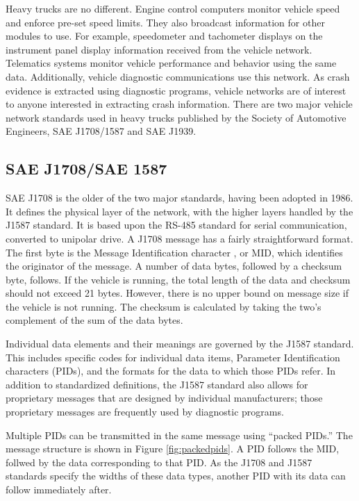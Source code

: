 Heavy trucks are no different. Engine control computers monitor vehicle speed and enforce pre-set speed limits. They also broadcast information
for other modules to use. For example, speedometer and tachometer displays on the instrument panel display information received from the vehicle
network. Telematics systems monitor vehicle performance and behavior using the same data. Additionally, vehicle diagnostic communications use
this network. As crash evidence is extracted using diagnostic programs, vehicle networks are of interest to anyone interested in extracting
crash information. There are two major vehicle network standards used in heavy trucks published by the Society of Automotive Engineers,
 SAE J1708/1587\cite{J1708}\cite{J1587} and SAE J1939\cite{J1939-71}.

\subsection{SAE J1708/SAE 1587}

SAE J1708 is the older of the two major standards, having been adopted in 1986. It defines the physical layer of the network,
with the higher layers handled by the J1587 standard. It is based upon the RS-485 standard for serial communication, converted to 
unipolar drive. A J1708 message has a fairly straightforward format. The first byte is the Message Identification character
, or MID, which identifies the originator of the message. A number of data bytes, followed by a checksum byte, follows. If the vehicle is running, 
the total length of the data and checksum should not exceed 21 bytes\cite{J1708}. However, there is no upper bound on message size if the vehicle 
is not running. The checksum is calculated by taking the two's complement of the sum of the data bytes.

Individual data elements and their meanings are governed by the J1587 standard\cite{J1587}. This includes specific codes for individual data items,
Parameter Identification characters (PIDs), and the formats for the data to which those PIDs refer. In addition to standardized definitions, 
the J1587 standard also allows for proprietary messages that are designed by individual manufacturers; those proprietary messages are frequently used by 
diagnostic programs.

Multiple PIDs can be transmitted in the same message using ``packed PIDs.'' The message structure is shown in Figure \ref{fig:packedpids}. A PID follows the MID, follwed by
the data corresponding to that PID. As the J1708 and J1587 standards specify the widths of these data types, another PID with its data can follow immediately
after.

